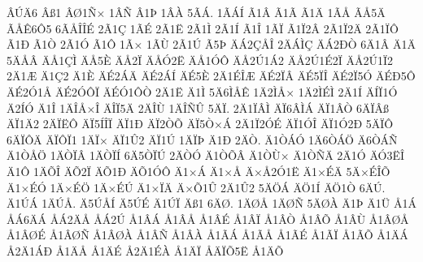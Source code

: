 {^^c2^^da^^c46
^^c2^^df1
^^c2^^d81^^d1^^d7
1^^c2^^d1
^^c21^^de
1^^c2^^c0
5^^c3^^c1.
1^^c3^^c1^^cd
^^c31^^c2
^^c31^^c3
^^c31^^c4
1^^c3^^c5
^^c3^^c55^^c4
^^c3^^c5^^ca6^^d45
6^^c3^^c5^^ce^^ce^^c9
2^^c31^^c7
1^^c3^^c9
2^^c31^^cb
2^^c31^^cc
2^^c31^^cd
^^c31^^ce
1^^c3^^cf
^^c31^^cf2^^c2
2^^c31^^cf2^^c4
2^^c31^^cf^^d4
^^c31^^d0
^^c31^^d2
2^^c31^^d3
^^c31^^d4
1^^c3^^d7
1^^c3^^d9
2^^c31^^da
^^c35^^de
^^c4^^c12^^c7^^c5^^ce
2^^c4^^c1^^cc^^c7
^^c4^^c12^^d0^^d2
6^^c41^^c2
^^c41^^c4
5^^c4^^c5^^c2
^^c4^^c51^^c7^^cc
^^c4^^c55^^c8
^^c4^^c52^^cf
^^c4^^c5^^d32^^cb
^^c4^^c51^^d3^^d4
^^c4^^c52^^da1^^c12
^^c4^^c52^^da1^^c92^^cf
^^c4^^c52^^da1^^cf2
2^^c41^^c6
^^c41^^c72
^^c41^^c8
^^c4^^c92^^c1^^c4
^^c4^^c92^^c1^^cd
^^c4^^c95^^c8
2^^c41^^c9^^ce^^c6
^^c4^^c92^^cf^^c2
^^c4^^c95^^cf^^ce
^^c4^^c92^^cf5^^d3
^^c4^^c9^^d05^^d4
^^c4^^c92^^d31^^c5
^^c4^^c92^^d3^^d4^^cf
^^c4^^c9^^d31^^d4^^d2
2^^c41^^cb
^^c41^^cc
5^^c46^^cc^^c5^^ca
1^^c42^^cc^^c5^^d7
1^^c42^^cc^^c9^^cc
2^^c41^^cd
^^c4^^cd^^cf1^^d3
^^c42^^cd^^d3
^^c41^^ce
1^^c4^^ce^^c5^^d7^^ce
^^c4^^ce^^cf5^^c4
2^^c4^^ce^^d9
1^^c4^^ce^^d1^^db
5^^c4^^cf.
2^^c41^^cf^^c2^^cc
^^c4^^cf6^^c2^^cc^^c1
^^c4^^cf1^^c2^^d2
6^^c4^^cf^^c2^^df
^^c4^^cf1^^c42
2^^c4^^cf^^cb^^d4
^^c4^^cf5^^cd^^ce^^cf
^^c4^^cf1^^d0
^^c4^^cf2^^d2^^d5
^^c4^^cf5^^d2^^d7^^c1
2^^c41^^cf2^^d3^^c9
^^c4^^cf1^^d3^^ce
^^c4^^cf1^^d32^^d0
5^^c4^^cf^^d4
6^^c4^^cf^^d4^^c4
^^c4^^cf^^d4^^cf1
1^^c4^^cf^^d7
^^c4^^cf1^^db2
^^c4^^cf1^^da
1^^c4^^cf^^de
^^c41^^d0
2^^c4^^d2.
^^c41^^d2^^c1^^d3
1^^c46^^d2^^c1^^d6
^^c46^^d2^^c1^^d1
^^c41^^d2^^c5^^d6
1^^c4^^d2^^cf^^c2
1^^c4^^d2^^cf^^cd
6^^c45^^d2^^cf^^da
2^^c4^^d2^^d3
^^c41^^d2^^d5^^c2
^^c41^^d2^^d9^^d7
^^c41^^d2^^d1^^c4
2^^c41^^d3
^^c4^^d33^^cb^^ce
^^c41^^d4
1^^c4^^d5^^ce
^^c4^^d52^^cf
^^c4^^d51^^d0
^^c4^^d51^^d3^^d4
^^c41^^d7^^c1
^^c41^^d7^^c5
^^c4^^d7^^c52^^d31^^cb
^^c41^^d7^^c9^^c4
5^^c4^^d7^^c9^^ce^^d5
^^c41^^d7^^c9^^d3
1^^c4^^d7^^c9^^d6
1^^c4^^d7^^c9^^da
^^c41^^d7^^cf^^c4
^^c4^^d7^^d51^^db
2^^c41^^db2
5^^c4^^d6^^c1
^^c4^^d61^^cd
^^c4^^d61^^d2
6^^c4^^da.
^^c41^^da^^c1
1^^c4^^da^^c5.
^^c45^^da^^c5^^cd
^^c45^^da^^c9
^^c41^^da^^cf
^^c4^^df1
6^^c4^^d8.
1^^c4^^d8^^c5
1^^c4^^d8^^d1
5^^c4^^d8^^c0
^^c41^^de
^^c41^^dc
^^c51^^c1
^^c5^^c16^^c4^^c1
^^c5^^c12^^c4^^c5
^^c5^^c12^^da
^^c51^^c2^^c1
^^c51^^c2^^c5
^^c51^^c2^^c9
^^c51^^c2^^cf
^^c51^^c2^^d2
^^c51^^c2^^d5
^^c51^^c2^^d9
^^c51^^c2^^d8^^c5
^^c51^^c2^^d8^^c9
^^c51^^c2^^d8^^d1
^^c51^^c2^^d8^^c0
^^c51^^c2^^d1
^^c51^^c2^^c0
^^c51^^c3^^c1
^^c51^^c3^^c5
^^c51^^c3^^c9
^^c51^^c3^^cf
^^c51^^c3^^d5
^^c51^^c4^^c1
^^c52^^c41^^c1^^d0
^^c51^^c4^^c5
^^c51^^c4^^c9
^^c52^^c41^^c9^^c0
^^c51^^c4^^cf
^^c5^^c4^^cf^^d55^^cb
^^c51^^c4^^d5
}
